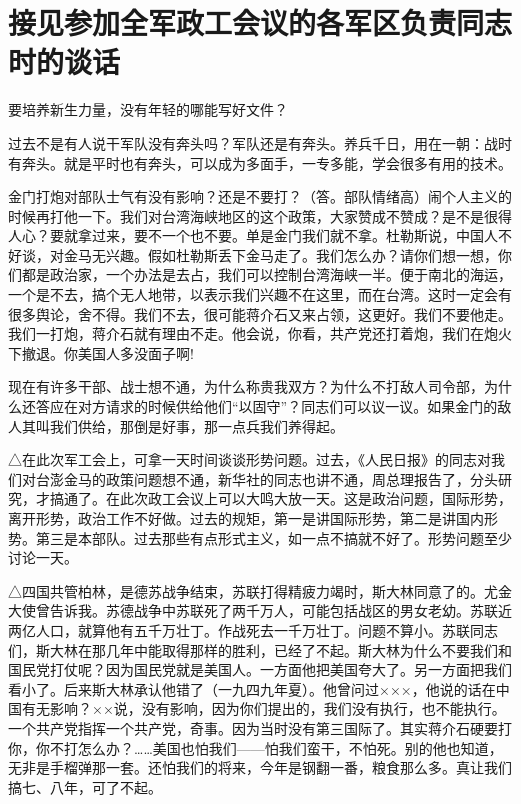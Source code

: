 \section[接见参加全军政工会议的各军区负责同志时的谈话（一九五八年十二月二十三日）]{接见参加全军政工会议的各军区负责同志时的谈话}


要培养新生力量，没有年轻的哪能写好文件？

过去不是有人说干军队没有奔头吗？军队还是有奔头。养兵千日，用在一朝：战时有奔头。就是平时也有奔头，可以成为多面手，一专多能，学会很多有用的技术。

金门打炮对部队士气有没有影响？还是不要打？（答。部队情绪高）闹个人主义的时候再打他一下。我们对台湾海峡地区的这个政策，大家赞成不赞成？是不是很得人心？要就拿过来，要不一个也不要。单是金门我们就不拿。杜勒斯说，中国人不好谈，对金马无兴趣。假如杜勒斯丢下金马走了。我们怎么办？请你们想一想，你们都是政治家，一个办法是去占，我们可以控制台湾海峡一半。便于南北的海运，一个是不去，搞个无人地带，以表示我们兴趣不在这里，而在台湾。这时一定会有很多舆论，舍不得。我们不去，很可能蒋介石又来占领，这更好。我们不要他走。我们一打炮，蒋介石就有理由不走。他会说，你看，共产党还打着炮，我们在炮火下撤退。你美国人多没面子啊!

现在有许多干部、战士想不通，为什么称贵我双方？为什么不打敌人司令部，为什么还答应在对方请求的时候供给他们“以固守”？同志们可以议一议。如果金门的敌人其叫我们供给，那倒是好事，那一点兵我们养得起。

△在此次军工会上，可拿一天时间谈谈形势问题。过去，《人民日报》的同志对我们对台澎金马的政策问题想不通，新华社的同志也讲不通，周总理报告了，分头研究，才搞通了。在此次政工会议上可以大鸣大放一天。这是政治问题，国际形势，离开形势，政治工作不好做。过去的规矩，第一是讲国际形势，第二是讲国内形势。第三是本部队。过去那些有点形式主义，如一点不搞就不好了。形势问题至少讨论一天。

△四国共管柏林，是德苏战争结束，苏联打得精疲力竭时，斯大林同意了的。尤金大使曾告诉我。苏德战争中苏联死了两千万人，可能包括战区的男女老幼。苏联近两亿人口，就算他有五千万壮丁。作战死去一千万壮丁。问题不算小。苏联同志们，斯大林在那几年中能取得那样的胜利，已经了不起。斯大林为什么不要我们和国民党打仗呢？因为国民党就是美国人。一方面他把美国夸大了。另一方面把我们看小了。后来斯大林承认他错了（一九四九年夏）。他曾问过×××，他说的话在中国有无影响？××说，没有影响，因为你们提出的，我们没有执行，也不能执行。一个共产党指挥一个共产党，奇事。因为当时没有第三国际了。其实蒋介石硬要打你，你不打怎么办？……美国也怕我们——怕我们蛮干，不怕死。别的他也知道，无非是手榴弹那一套。还怕我们的将来，今年是钢翻一番，粮食那么多。真让我们搞七、八年，可了不起。

